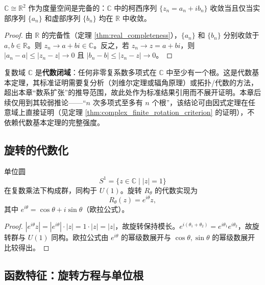 \begin{proposition}[复数的完备性]\label{prop:complex_completeness}
$\mathbb{C} \cong \mathbb{R}^2$ 作为度量空间是完备的：$\mathbb{C}$ 中的柯西序列 $\{z_n = a_n + ib_n\}$ 收敛当且仅当实部序列 $\{a_n\}$ 和虚部序列 $\{b_n\}$ 均在 $\mathbb{R}$ 中收敛。
\end{proposition}

\begin{proof}
由 $\mathbb{R}$ 的完备性（定理 \ref{thm:real_completeness}），$\{a_n\}$ 和 $\{b_n\}$ 分别收敛于 $a, b \in \mathbb{R}$。则 $z_n \to a + bi \in \mathbb{C}$。反之，若 $z_n \to z = a+bi$，则 $|a_n - a| \le |z_n - z| \to 0$ 且 $|b_n - b| \le |z_n - z| \to 0$。
\end{proof}

\begin{remark}\label{rem:fta}
复数域 $\mathbb{C}$ 是\textbf{代数闭域}：任何非零复系数多项式在 $\mathbb{C}$ 中至少有一个根。这是代数基本定理，其标准证明需要复分析（刘维尔定理或辐角原理）或拓扑/代数的方法，超出本章“数系扩张”的推导范围，故此处作为标准结果引用而不展开证明。本章后续仅用到其较弱推论——“$n$ 次多项式至多有 $n$ 个根”，该结论可由因式定理在任意域上直接证明（见定理 \ref{thm:complex_finite_rotation_criterion} 的证明），不依赖代数基本定理的完整强度。
\end{remark}

\subsection{\texorpdfstring{旋转的代数化}{旋转的代数化}}

\begin{theorem}[复数旋转代数化]\label{thm:complex_rotation_algebraization}
单位圆
\[
S^1 = \{z \in \mathbb{C} \mid |z| = 1\}
\]
在复数乘法下构成群，同构于 $U(1)$。旋转 $R_\theta$ 的代数实现为
\[
R_\theta(z) = e^{i\theta} z,
\]
其中 $e^{i\theta} = \cos\theta + i\sin\theta$（欧拉公式）。
\end{theorem}

\begin{proof}
$|e^{i\theta} z| = |e^{i\theta}| \cdot |z| = 1 \cdot |z| = |z|$，故旋转保持模长。$e^{i(\theta_1 + \theta_2)} = e^{i\theta_1} e^{i\theta_2}$，故旋转群与 $U(1)$ 同构。欧拉公式由 $e^{i\theta}$ 的幂级数展开与 $\cos\theta, \sin\theta$ 的幂级数展开比较得出。
\end{proof}

\subsection{\texorpdfstring{函数特征：旋转方程与单位根}{函数特征：旋转方程与单位根}}

